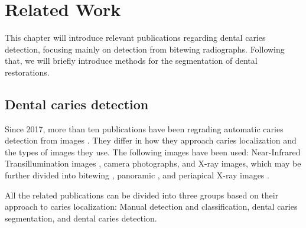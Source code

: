 \chapter{Related Work}
\label{chapter:related_work}
This chapter will introduce relevant publications regarding dental caries detection, focusing mainly on detection from bitewing radiographs. Following that, we will briefly introduce methods for the segmentation of dental restorations.

\section{Dental caries detection}
Since 2017, more than ten publications have been regrading automatic caries detection from images \cite{PradosPrivado2020}. They differ in how they approach caries localization and the types of images they use. The following images have been used: Near-Infrared Transillumination images \cite{Casalegno2019,Schwendicke2020}, camera photographs, \cite{Moutselos2019} and X-ray images, which may be further divided into bitewing \cite{Moran2021, Cantu2020, Bayrakdar2021, Mao2021, Srivastava2017}, panoramic \cite{Lian2021}, and periapical X-ray images \cite{Lee2018}.

All the related publications can be divided into three groups based on their approach to caries localization: Manual detection and classification, dental caries segmentation, and dental caries detection.

